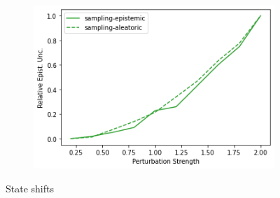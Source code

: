 \begin{figure}
\begin{subfigure}{.24\textwidth}
    \end{subfigure}
    \begin{subfigure}{.24\textwidth}
        \includegraphics[width=\textwidth]{sections/011_icml2022/resources/state_shift-PostNet-LunarLanderShift-v0-mean_epistemic_uncertainty_.png}
    \end{subfigure}
        \vspace{-3mm}
    \caption*{State shifts}
    \vspace{2mm}


\end{figure}
